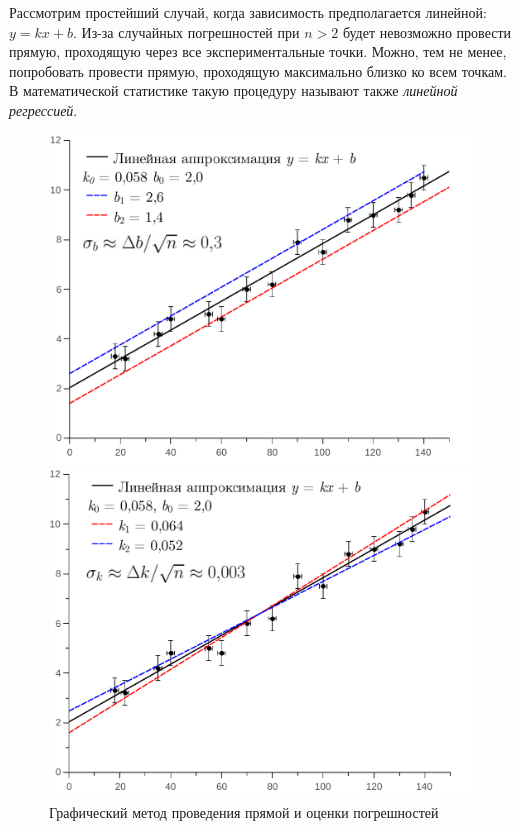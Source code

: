 Рассмотрим простейший случай, когда зависимость предполагается линейной:
$y=kx+b$. Из-за случайных погрешностей при $n>2$
будет невозможно провести прямую, проходящую через все экспериментальные точки. 
Можно, тем не менее, попробовать провести 
прямую, проходящую максимально близко ко всем точкам. В математической
статистике такую процедуру называют также \emph{линейной регрессией}.

\begin{figure}[th]
\begin{minipage}[t]{0.5\columnwidth}%
\includegraphics[width=1\linewidth]{images/graph1.pdf}%
\end{minipage}%
\begin{minipage}[t]{0.5\columnwidth}%
\includegraphics[width=1\linewidth]{images/graph2.pdf}%
\end{minipage}
\caption{Графический метод проведения прямой и оценки погрешностей}
\end{figure}

